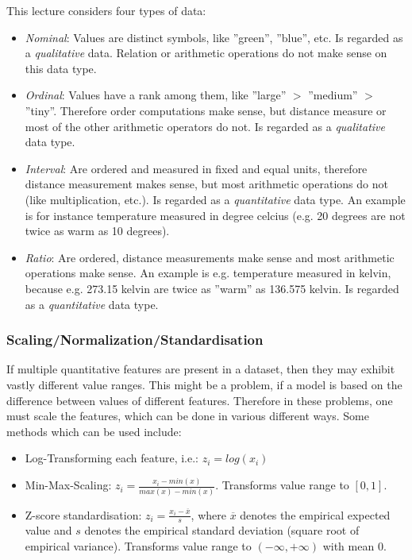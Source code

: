 \documentclass[12pt,a4paper]{article}
\begin{document}
\noindent This lecture considers four types of data:

\begin{itemize}
    \item \textit{Nominal}: Values are distinct symbols, like ''green'', ''blue'', etc. Is regarded as a \textit{qualitative} data. Relation or arithmetic operations do not make sense on this data type.
    \item \textit{Ordinal}: Values have a rank among them, like ''large'' \(>\) ''medium'' \(>\) ''tiny''. Therefore order computations make sense, but distance measure or most of the other arithmetic operators do not. Is regarded as a \textit{qualitative} data type.
    \item \textit{Interval}: Are ordered and measured in fixed and equal units, therefore distance measurement makes sense, but most arithmetic operations do not (like multiplication, etc.). Is regarded as a \textit{quantitative} data type. An example is for instance temperature measured in degree celcius (e.g. 20 degrees are not twice as warm as 10 degrees).
    \item \textit{Ratio}: Are ordered, distance measurements make sense and most arithmetic operations make sense. An example is e.g. temperature measured in kelvin, because e.g. 273.15 kelvin are twice as ''warm'' as 136.575 kelvin. Is regarded as a \textit{quantitative} data type.
\end{itemize}

\subsubsection{Scaling/Normalization/Standardisation}

\noindent If multiple quantitative features are present in a dataset, then they may exhibit vastly different value ranges. This might be a problem, if a model is based on the difference between values of different features. Therefore in these problems, one must scale the features, which can be done in various different ways. Some methods which can be used include:
\begin{itemize}
    \item Log-Transforming each feature, i.e.: \(z_i = log(x_i)\)
    \item Min-Max-Scaling: \(z_i = \frac{x_i - min(x)}{max(x) - min(x)}\). Transforms value range to \([0,1]\).
    \item Z-score standardisation: \(z_i = \frac{x_i - \overline{x}}{s}\), where \(\overline{x}\) denotes the empirical expected value and \(s\) denotes the empirical standard deviation (square root of empirical variance). Transforms value range to \((-\infty, +\infty)\) with mean \(0\).
\end{itemize}
\end{document}

